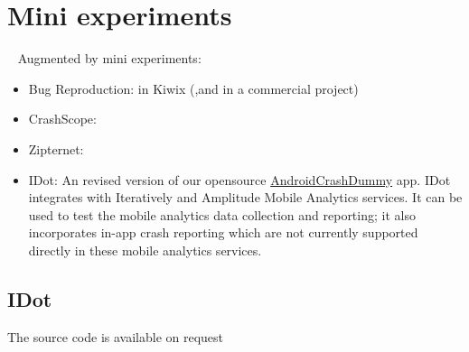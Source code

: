 \section{Mini experiments}~\label{section-mini-experiments}
Augmented by mini experiments:

\begin{itemize}
    \item Bug Reproduction: in Kiwix (,and in a commercial project)
    \item CrashScope:
    \item Zipternet: 
    \item IDot: An revised version of our opensource \href{https://github.com/ISNIT0/AndroidCrashDummy}{AndroidCrashDummy} app. IDot integrates with Iteratively and Amplitude Mobile Analytics services. It can be used to test the mobile analytics data collection and reporting; it also incorporates in-app crash reporting which are not currently supported directly in these mobile analytics services.
\end{itemize}

\subsection{IDot}
The source code is available on request %
